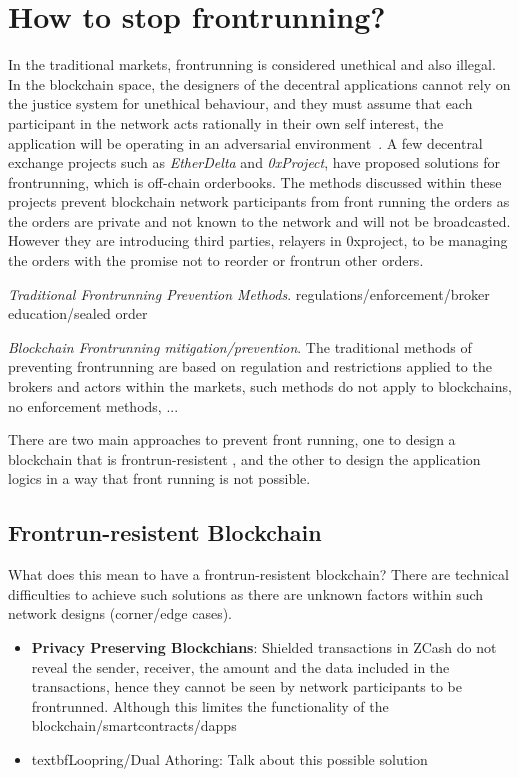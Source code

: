 \section{How to stop frontrunning?}
In the traditional markets, frontrunning is considered unethical and also illegal. In the blockchain space, the designers of the decentral applications cannot rely on the justice system for unethical behaviour, and they must assume that each participant in the network acts rationally in their own self interest, the application will be operating in an adversarial environment~\cite{0xfrontrunning:online}.
A few decentral exchange projects such as \textit{EtherDelta} and \textit{0xProject}, have proposed solutions for frontrunning, which is off-chain orderbooks. The methods discussed within these projects prevent blockchain network participants from front running the orders as the orders are private and not known to the network and will not be broadcasted. However they are introducing third parties, \eg relayers in 0xproject, to be managing the orders with the promise not to reorder or frontrun other orders. 

\emph{Traditional Frontrunning Prevention Methods}. regulations/enforcement/broker education/sealed order


\emph{Blockchain Frontrunning mitigation/prevention}. The traditional methods of preventing frontrunning are based on regulation and restrictions applied to the brokers and actors within the markets, such methods do not apply to blockchains, no enforcement methods, ... 

There are two main approaches to prevent front running, one to design a blockchain that is frontrun-resistent , and the other to design the application logics in a way that front running is not possible. 


\subsection{Frontrun-resistent Blockchain}
What does this mean to have a frontrun-resistent blockchain?  There are technical difficulties to achieve such solutions as there are unknown factors within such network designs (corner/edge cases).

\begin{itemize}
\item{\textbf{Privacy Preserving Blockchians}: Shielded transactions in ZCash do not reveal the sender, receiver, the amount and the data included in the transactions, hence they cannot be seen by network participants to be frontrunned. Although this limites the functionality of the blockchain/smartcontracts/dapps }
\item{textbf{Loopring/Dual Athoring}: Talk about this possible solution}

\end{itemize}


